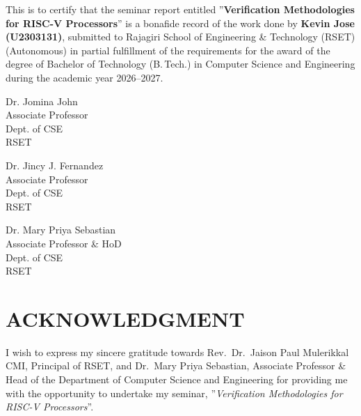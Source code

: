 \documentclass[12pt,a4paper]{report}
\begin{document}
This is to certify that the seminar report entitled ''\textbf{Verification
Methodologies for RISC-V Processors}'' is a bonafide record of the work done by
\textbf{Kevin Jose (U2303131)}, submitted to Rajagiri School of Engineering \&
Technology (RSET) (Autonomous) in partial fulfillment of the requirements for the
award of the degree of Bachelor of Technology (B.\,Tech.) in Computer Science and
Engineering during the academic year 2026--2027.

\vspace{2.4cm}
\noindent
\begin{minipage}[t]{0.5\textwidth}
Dr. Jomina John\\
Associate Professor\\
Dept. of CSE\\
RSET
\end{minipage}%
\begin{minipage}[t]{0.5\textwidth}
\raggedleft
Dr. Jincy J. Fernandez\\
Associate Professor\\
Dept. of CSE\\
RSET
\end{minipage}

\vspace{2.2cm}
\begin{center}
Dr. Mary Priya Sebastian\\
Associate Professor \& HoD\\
Dept. of CSE\\
RSET
\end{center}

\clearpage
{}
\setcounter{page}{1}

\chapter*{ACKNOWLEDGMENT}
\thispagestyle{fancy}

\hspace{0.5cm} I wish to express my sincere gratitude towards Rev.\ Dr.\ Jaison Paul
Mulerikkal CMI, Principal of RSET, and Dr.\ Mary Priya Sebastian, Associate Professor
\& Head of the Department of Computer Science and Engineering for providing me with the
opportunity to undertake my seminar, ''\textit{Verification Methodologies for RISC-V
Processors}''.
\end{document}
